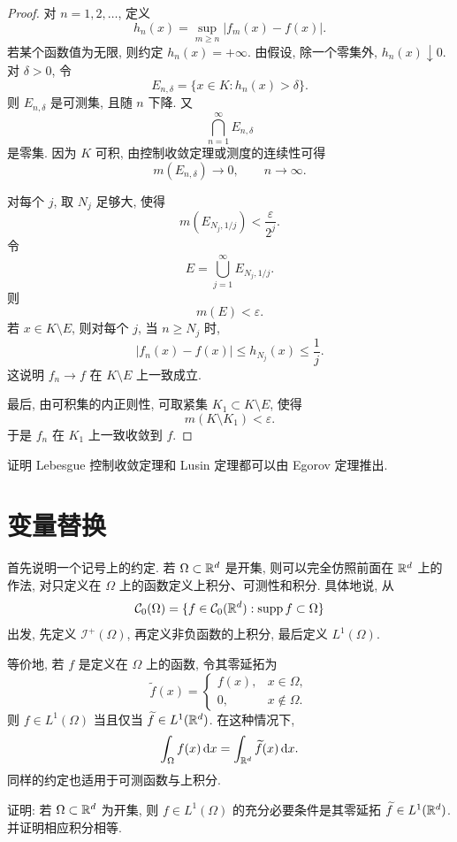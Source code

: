 \begin{proof}
	对 \(n=1,2,\ldots\), 定义
	\[
	h_n(x)=\sup_{m\geq n}|f_m(x)-f(x)|.
	\]
	若某个函数值为无限, 则约定 \(h_n(x)=+\infty\). 由假设, 除一个零集外, \(h_n(x)\downarrow0\). 对 \(\delta>0\), 令
	\[
	E_{n,\delta}=\{x\in K:h_n(x)>\delta\}.
	\]
	则 \(E_{n,\delta}\) 是可测集, 且随 \(n\) 下降. 又
	\[
	\bigcap_{n=1}^{\infty}E_{n,\delta}
	\]
	是零集. 因为 \(K\) 可积, 由控制收敛定理或测度的连续性可得
	\[
	m(E_{n,\delta})\to0,
	\qquad n\to\infty.
	\]
	
	对每个 \(j\), 取 \(N_j\) 足够大, 使得
	\[
	m(E_{N_j,1/j})<\frac{\varepsilon}{2^j}.
	\]
	令
	\[
	E=\bigcup_{j=1}^{\infty}E_{N_j,1/j}.
	\]
	则
	\[
	m(E)<\varepsilon.
	\]
	若 \(x\in K\setminus E\), 则对每个 \(j\), 当 \(n\geq N_j\) 时,
	\[
	|f_n(x)-f(x)|
	\leq h_{N_j}(x)
	\leq \frac1j.
	\]
	这说明 \(f_n\to f\) 在 \(K\setminus E\) 上一致成立.
	
	最后, 由可积集的内正则性, 可取紧集 \(K_1\subset K\setminus E\), 使得
	\[
	m(K\setminus K_1)<\varepsilon.
	\]
	于是 \(f_n\) 在 \(K_1\) 上一致收敛到 \(f\).
\end{proof}

\begin{exer}\label{exer:dct-lusin-from-egorov}
	证明 Lebesgue 控制收敛定理和 Lusin 定理都可以由 Egorov 定理推出.
\end{exer}

\clearpage

\section{变量替换}
\label{sec:change-of-variables-lebesgue}

首先说明一个记号上的约定. 若 \(\Omega\subset\mathbb{R}^d\) 是开集, 则可以完全仿照前面在 \(\mathbb{R}^d\) 上的作法, 对只定义在 \(\Omega\) 上的函数定义上积分、可测性和积分. 具体地说, 从
\[
\mathcal{C}_0(\Omega)=\{f\in \mathcal{C}_0(\mathbb{R}^d):\operatorname{supp}f\subset\Omega\}
\]
出发, 先定义 \(\mathcal I^+(\Omega)\), 再定义非负函数的上积分, 最后定义 \(L^1(\Omega)\).

等价地, 若 \(f\) 是定义在 \(\Omega\) 上的函数, 令其零延拓为
\[
\widetilde f(x)=
\begin{cases}
	f(x), & x\in\Omega,\\
	0, & x\notin\Omega.
\end{cases}
\]
则 \(f\in L^1(\Omega)\) 当且仅当 \(\widetilde f\in L^1(\mathbb{R}^d)\). 在这种情况下,
\[
\int_\Omega f(x)\,\dd x
=
\int_{\mathbb{R}^d}\widetilde f(x)\,\dd x.
\]
同样的约定也适用于可测函数与上积分.

\begin{exer}\label{exer:l1-on-open-set-zero-extension}
	证明: 若 \(\Omega\subset\mathbb{R}^d\) 为开集, 则 \(f\in L^1(\Omega)\) 的充分必要条件是其零延拓 \(\widetilde f\in L^1(\mathbb{R}^d)\). 并证明相应积分相等.
\end{exer}

